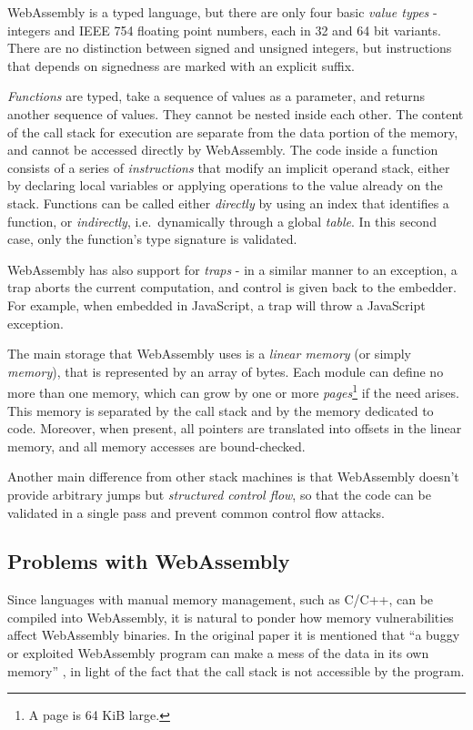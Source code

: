 WebAssembly is a typed language, but there are only four basic \textit{value types} - integers and IEEE 754 floating
point numbers, each in 32 and 64 bit variants. There are no distinction between signed and unsigned integers,
but instructions that depends on signedness are marked with an explicit suffix.

\textit{Functions} are typed, take a sequence of values as a parameter, and returns another sequence of values.
They cannot be nested inside each other. The content of the call stack for execution are separate from the data
portion of the memory, and cannot be accessed directly by WebAssembly.
The code inside a function consists of a series of \textit{instructions} that modify an implicit operand stack,
either by declaring local variables or applying operations to the value already on the stack.
Functions can be called either \textit{directly} by using an index that identifies a function, or \textit{indirectly},
i.e.\ dynamically through a global \textit{table}. In this second case, only the function's type signature is validated.

WebAssembly has also support for \textit{traps} - in a similar manner to an exception, a trap aborts the current
computation, and control is given back to the embedder. For example, when embedded in JavaScript, a trap will
throw a JavaScript exception.

The main storage that WebAssembly uses is a \textit{linear memory} (or simply \textit{memory}), that is represented
by an array of bytes. Each module can define no more than one memory, which can grow by one or more
\textit{pages}\footnote{A page is 64 KiB large.} if the need arises.
This memory is separated by the call stack and by the memory dedicated to code.
Moreover, when present, all pointers are translated into offsets in the linear memory, and all memory accesses are bound-checked.

Another main difference from other stack machines is that WebAssembly doesn't provide arbitrary jumps but
\textit{structured control flow}, so that the code can be validated in a single pass and prevent common control flow attacks.

\subsection{Problems with WebAssembly}

Since languages with manual memory management, such as C/C++, can be compiled into WebAssembly,
it is natural to ponder how memory vulnerabilities affect WebAssembly binaries.
In the original paper it is mentioned that ``a buggy or exploited WebAssembly program can make a mess of the data in its own memory''
\cite{bringing-the-web-up-to-speed-2017}, in light of the fact that the call stack is not accessible by the program.

